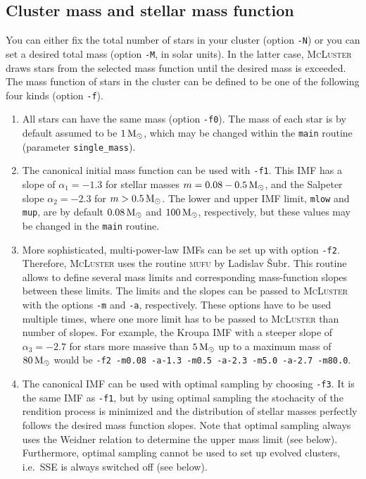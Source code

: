 \documentclass[useAMS,usenatbib]{mn2e}
\newcommand{\msun}{\mbox{$\,{\rm M}_\odot$}}
\begin{document}
\subsection*{Cluster mass and stellar mass function}
You can either fix the total number of stars in your cluster (option \texttt{-N}) or you can set a desired total mass (option \texttt{-M}, in solar units). In the latter case, \textsc{McLuster} draws stars from the selected mass function until the desired mass is exceeded. The mass function of stars in the cluster can be defined to be one of the following four kinds (option \texttt{-f}).
\begin{enumerate}
\item All stars can have the same mass (option \texttt{-f0}). The mass of each star is by default assumed to be $1\msun$, which may be changed within the \texttt{main} routine (parameter \texttt{single\_mass}).
\item The canonical \citet{Kroupa01} initial mass function can be used with \texttt{-f1}. This IMF has a slope of $\alpha_1 = -1.3$ for stellar masses $m = 0.08 - 0.5 \msun$, and the Salpeter slope
$\alpha_2 = -2.3$ for $m > 0.5 \msun$. The lower and upper IMF limit, \texttt{mlow} and \texttt{mup}, are by default $0.08\msun$ and $100\msun$, respectively, but these values may be changed in the \texttt{main} routine. 
\item More sophisticated, multi-power-law IMFs can be set up with option \texttt{-f2}. Therefore, \textsc{McLuster} uses the routine \textsc{mufu} by Ladislav {\v S}ubr. This routine allows to define several mass limits and corresponding mass-function slopes between these limits. The limits and the slopes can be passed to \textsc{McLuster} with the options \texttt{-m} and \texttt{-a}, respectively. These options have to be used multiple times, where one more limit has to be passed to \textsc{McLuster} than number of slopes. For example, the Kroupa IMF with a steeper slope of $\alpha_3 = -2.7$ for stars more massive than $5\msun$ up to a maximum mass of $80\msun$ would be \texttt{-f2 -m0.08 -a-1.3 -m0.5 -a-2.3 -m5.0 -a-2.7 -m80.0}.
\item The canonical IMF can be used with optimal sampling \citep{Kroupa11} by choosing \texttt{-f3}. It is the same IMF as \texttt{-f1}, but by using optimal sampling the stochacity of the rendition process is minimized and the distribution of stellar masses perfectly follows the desired mass function slopes. Note that optimal sampling always uses the Weidner relation to determine the upper mass limit (see below). Furthermore, optimal sampling cannot be used to set up evolved clusters, i.e.~\textsc{SSE} is always switched off (see below).

\end{enumerate}
\end{document}
